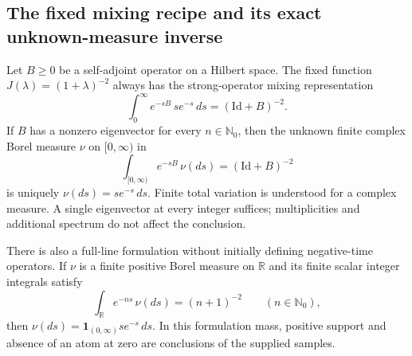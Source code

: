 \subsection{The fixed mixing recipe and its exact unknown-measure inverse}

\begin{theorem}
\label{final:O5}
Let $B\geq0$ be a self-adjoint operator on a Hilbert space.  The fixed
function $J(\lambda)=(1+\lambda)^{-2}$ always has the strong-operator
mixing representation
\begin{equation}\label{final:O5-J}
 \int_0^\infty e^{-sB}\,s e^{-s}\,ds
       =(\mathrm{Id}+B)^{-2}.
\end{equation}
If $B$ has a nonzero eigenvector for every $n\in\mathbb N_0$, then
the unknown finite complex Borel measure $\nu$ on $[0,\infty)$ in
\begin{equation}\label{final:O5-unknown}
 \int_{[0,\infty)}e^{-sB}\,\nu(ds)=(\mathrm{Id}+B)^{-2}
\end{equation}
is uniquely $\nu(ds)=s e^{-s}\,ds$.
Finite total variation is understood for a complex measure.  A single
eigenvector at every integer suffices; multiplicities and additional
spectrum do not affect the conclusion.

There is also a full-line formulation without initially defining
negative-time operators.  If $\nu$ is a finite positive Borel measure
on $\mathbb R$ and its finite scalar integer integrals satisfy
\begin{equation}\label{final:O5-integer-samples}
 \int_{\mathbb R}e^{-ns}\,\nu(ds)=(n+1)^{-2}
 \qquad(n\in\mathbb N_0),
\end{equation}
then $\nu(ds)=\mathbf1_{(0,\infty)}s e^{-s}\,ds$.
In this formulation mass, positive support and absence of an atom
at zero are conclusions of the supplied samples.
\end{theorem}


